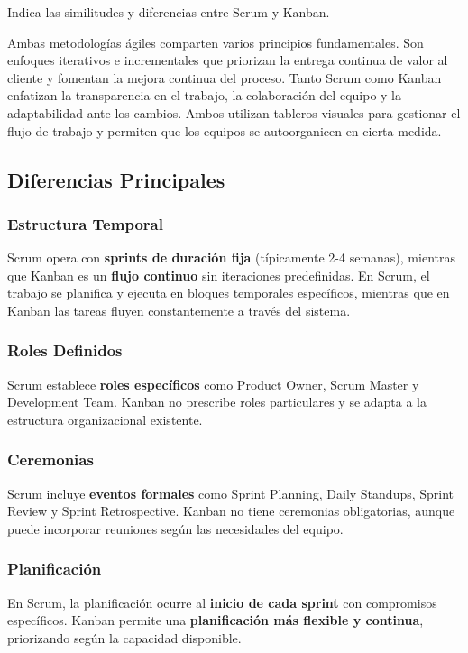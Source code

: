 

\begin{enunciado}
    Indica las similitudes y diferencias entre Scrum y Kanban.
\end{enunciado}


Ambas metodologías ágiles comparten varios principios fundamentales.
Son enfoques iterativos e incrementales que priorizan la entrega continua de valor al cliente y fomentan la mejora continua del proceso.
Tanto Scrum como Kanban enfatizan la transparencia en el trabajo, la colaboración del equipo y la adaptabilidad ante los cambios.
Ambos utilizan tableros visuales para gestionar el flujo de trabajo y permiten que los equipos se autoorganicen en cierta medida.

\subsection{Diferencias Principales}\label{subsec:diferencias-principales}

\subsubsection{Estructura Temporal}
Scrum opera con \textbf{sprints de duración fija} (típicamente 2-4 semanas), mientras que Kanban es un \textbf{flujo continuo} sin iteraciones predefinidas.
En Scrum, el trabajo se planifica y ejecuta en bloques temporales específicos, mientras que en Kanban las tareas fluyen constantemente a través del sistema.

\subsubsection{Roles Definidos}
Scrum establece \textbf{roles específicos} como Product Owner, Scrum Master y Development Team.
Kanban no prescribe roles particulares y se adapta a la estructura organizacional existente.

\subsubsection{Ceremonias}
Scrum incluye \textbf{eventos formales} como Sprint Planning, Daily Standups, Sprint Review y Sprint Retrospective.
Kanban no tiene ceremonias obligatorias, aunque puede incorporar reuniones según las necesidades del equipo.

\subsubsection{Planificación}
En Scrum, la planificación ocurre al \textbf{inicio de cada sprint} con compromisos específicos.
Kanban permite una \textbf{planificación más flexible y continua}, priorizando según la capacidad disponible.

